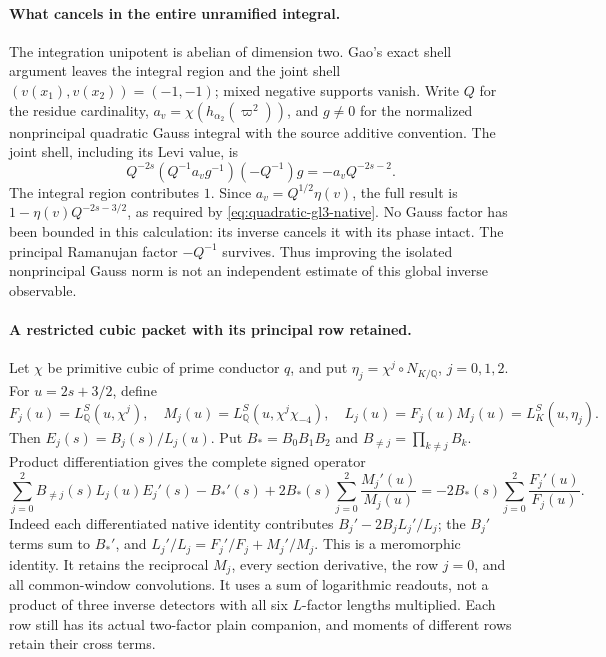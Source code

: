 \paragraph{What cancels in the entire unramified integral.}
The integration unipotent is abelian of dimension two. Gao's exact
shell argument leaves the integral region and the joint shell
\((v(x_1),v(x_2))=(-1,-1)\); mixed negative supports vanish.
Write \(Q\) for the residue cardinality,
\(a_v=\chi(h_{\alpha_2}(\varpi^2))\), and \(g\ne0\) for the
normalized nonprincipal quadratic Gauss integral with the source
additive convention. The joint shell, including its Levi value, is
\[
 Q^{-2s}\left(Q^{-1}a_vg^{-1}\right)
                 \left(-Q^{-1}\right)g
       =-a_vQ^{-2s-2}.
\]
The integral region contributes \(1\). Since
\(a_v=Q^{1/2}\eta(v)\), the full result is
\(1-\eta(v)Q^{-2s-3/2}\), as required by
\eqref{eq:quadratic-gl3-native}. No Gauss factor has been bounded
in this calculation: its inverse cancels it with its phase intact.
The principal Ramanujan factor \(-Q^{-1}\) survives.
Thus improving the isolated nonprincipal Gauss norm is not an
independent estimate of this global inverse observable.

\paragraph{A restricted cubic packet with its principal row retained.}
Let \(\chi\) be primitive cubic of prime conductor \(q\), and put
\(\eta_j=\chi^j\circ N_{K/\mathbb Q}\), \(j=0,1,2\).
For \(u=2s+3/2\), define
\[
 F_j(u)=L_{\mathbb Q}^S(u,\chi^j),\quad
 M_j(u)=L_{\mathbb Q}^S(u,\chi^j\chi_{-4}),\quad
 L_j(u)=F_j(u)M_j(u)=L_K^S(u,\eta_j).
\]
Then \(E_j(s)=B_j(s)/L_j(u)\). Put
\(B_* = B_0B_1B_2\) and
\(B_{\ne j}=\prod_{k\ne j}B_k\). Product differentiation gives
the complete signed operator
\begin{equation}\label{eq:quadratic-full-cubic-packet}
 \sum_{j=0}^2 B_{\ne j}(s)L_j(u)E_j'(s)-B_*'(s)
 +2B_*(s)\sum_{j=0}^2\frac{M_j'(u)}{M_j(u)}
 =-2B_*(s)\sum_{j=0}^2\frac{F_j'(u)}{F_j(u)}.
\end{equation}
Indeed each differentiated native identity contributes
\(B_j'-2B_jL_j'/L_j\); the \(B_j'\) terms sum to \(B_*'\),
and \(L_j'/L_j=F_j'/F_j+M_j'/M_j\). This is a meromorphic
identity. It retains the reciprocal \(M_j\), every section derivative,
the row \(j=0\), and all common-window convolutions.
It uses a sum of logarithmic readouts, not a product of three
inverse detectors with all six \(L\)-factor lengths multiplied.
Each row still has its actual two-factor plain companion, and
moments of different rows retain their cross terms.

